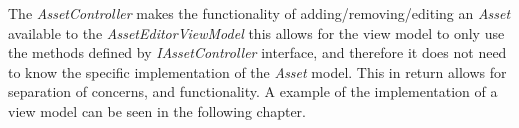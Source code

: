 The \textit{AssetController} makes the functionality of adding/removing/editing an \textit{Asset} available to the \textit{AssetEditorViewModel} this allows for the view model to only use the methods defined by \textit{IAssetController} interface, and therefore it does not need to know the specific implementation of the \textit{Asset} model. This in return allows for separation of concerns, and functionality. A example of the implementation of a view model can be seen in the following chapter.
